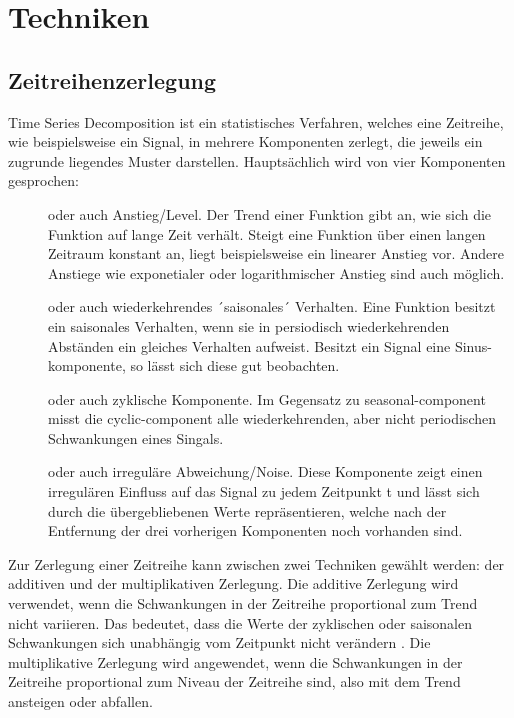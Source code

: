 
\chapter{Techniken}


\section{Zeitreihenzerlegung}
\label{techniques:decomposition}

Time Series Decomposition ist ein statistisches Verfahren, welches eine Zeitreihe, wie beispielsweise ein Signal,
in mehrere Komponenten zerlegt, die jeweils ein zugrunde liegendes Muster darstellen.
Hauptsächlich wird von vier Komponenten gesprochen:

\begin{description}
    \item[] oder auch Anstieg/Level. Der Trend einer Funktion gibt an, wie
        sich die Funktion auf lange Zeit verhält.
        Steigt eine Funktion über einen langen Zeitraum konstant an, liegt beispielsweise ein linearer Anstieg vor.
        Andere Anstiege wie exponetialer oder logarithmischer Anstieg sind auch möglich.
    \item[] oder auch wiederkehrendes ´saisonales´ Verhalten. Eine
        Funktion besitzt ein saisonales Verhalten, wenn sie in persiodisch wiederkehrenden Abständen ein gleiches Verhalten aufweist.
        Besitzt ein Signal eine Sinus-komponente, so lässt sich diese gut beobachten.
    \item[] oder auch zyklische Komponente. Im Gegensatz zu seasonal-component
        misst die cyclic-component alle wiederkehrenden, aber nicht periodischen Schwankungen eines Singals.
    \item[] oder auch irreguläre Abweichung/Noise. Diese Komponente
        zeigt einen irregulären Einfluss auf das Signal zu jedem Zeitpunkt t und lässt sich durch die übergebliebenen Werte
        repräsentieren, welche nach der Entfernung der drei vorherigen Komponenten noch vorhanden sind.
\end{description}

Zur Zerlegung einer Zeitreihe kann zwischen zwei Techniken gewählt werden: der additiven und der multiplikativen Zerlegung. 
Die additive Zerlegung wird verwendet, wenn die Schwankungen in der Zeitreihe proportional zum Trend nicht variieren. Das bedeutet, dass die Werte der zyklischen oder 
saisonalen Schwankungen sich unabhängig vom Zeitpunkt nicht verändern \cite{61Timese93:online}. Die multiplikative Zerlegung wird angewendet, wenn die Schwankungen in der 
Zeitreihe proportional zum Niveau der Zeitreihe sind, also mit dem Trend ansteigen oder abfallen.

